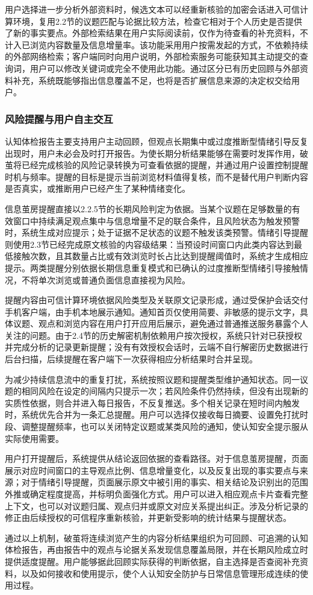 用户选择进一步分析外部资料时，候选文本可以经重新核验的加密会话进入可信计算环境，复用2.2节的议题匹配与论据比较方法，检查它相对于个人历史是否提供了新的事实要点。外部检索结果在用户实际阅读前，仅作为待查看的补充资料，不计入已浏览内容数量及信息增量率。该功能采用用户按需发起的方式，不依赖持续的外部网络检索；客户端同时向用户说明，外部检索服务可能获知其主动提交的查询词，用户可以修改关键词或完全不使用此功能。通过区分已有历史回顾与外部资料补充，系统既能够指出信息覆盖不足，也将是否扩展信息来源的决定权交给用户。

\subsubsection{风险提醒与用户自主交互}\label{section:2.5.4}

认知体检报告主要支持用户主动回顾，但观点长期集中或过度推断型情绪引导反复出现时，用户未必会及时打开报告。为使长期分析结果能够在需要时发挥作用，破茧将已经完成核验的风险记录转换为可查看依据的提醒，并通过用户设置控制提醒时机与频率。提醒的目标是提示当前浏览材料值得复核，而不是替代用户判断内容是否真实，或推断用户已经产生了某种情绪变化。

信息茧房提醒直接以2.2.5节的长期风险判定为依据。当某个议题在足够数量的有效窗口中持续满足观点集中与信息增量不足的联合条件，且风险状态为触发预警时，系统生成对应提示；处于证据不足状态的议题不触发该类预警。情绪引导提醒则使用2.3节已经完成原文核验的内容级结果：当预设时间窗口内此类内容达到最低接触次数，且其数量占比或有效浏览时长占比达到提醒阈值时，系统才生成相应提示。两类提醒分别依据长期信息重复模式和已确认的过度推断型情绪引导接触情况，不将单次浏览或普通负面信息直接视为风险。

提醒内容由可信计算环境依据风险类型及关联原文记录形成，通过受保护会话交付手机客户端，由手机本地展示通知。通知首页仅使用简要、非敏感的提示文字，具体议题、观点和浏览内容在用户打开应用后展示，避免通过普通推送服务暴露个人关注的问题。由于2.4节的历史解密机制依赖用户按次授权，系统只针对已获授权并完成分析的记录更新提醒；没有有效授权会话时，云端不自行解密历史数据进行后台扫描，后续提醒在客户端下一次获得相应分析结果时合并呈现。

为减少持续信息流中的重复打扰，系统按照议题和提醒类型维护通知状态。同一议题的相同风险在设定的间隔内只提示一次；若风险条件仍然持续，但没有出现新的实质性依据，则合并进入每日报告，不反复推送。多个相关记录在短时间内触发时，系统优先合并为一条汇总提醒。用户可以选择仅接收每日摘要、设置免打扰时段、调整提醒频率，也可以关闭特定议题或某类风险的通知，使认知安全提示服从实际使用需要。

用户打开提醒后，系统提供从结论返回依据的查看路径。对于信息茧房提醒，页面展示对应时间窗口的主导观点比例、信息增量变化，以及反复出现的事实要点与来源；对于情绪引导提醒，页面展示原文中被引用的事实、相关结论及识别出的范围外推或确定程度提高，并标明负面强化方式。用户可以进入相应观点卡片查看完整上下文，也可以对议题归属、观点归并或原文对应关系提出纠正。涉及分析记录的修正由后续授权的可信程序重新核验，并更新受影响的统计结果与提醒状态。

通过以上机制，破茧将连续浏览产生的内容分析结果组织为可回顾、可追溯的认知体检报告，再由报告中的观点与论据关系发现信息覆盖局限，并在长期风险成立时提供适度提醒。用户能够据此回顾实际获得的判断依据，自主选择是否查阅补充资料，以及如何接收和使用提示，使个人认知安全防护与日常信息管理形成连续的使用过程。
